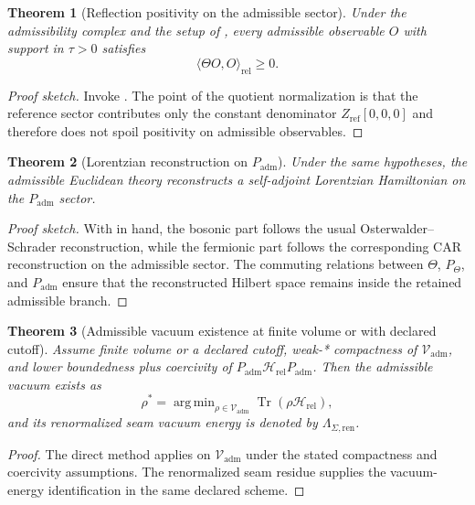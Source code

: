 \documentclass[11pt,a4paper]{article}
\newtheorem{theorem}{Theorem}[section]
\theoremstyle{definition}
\theoremstyle{remark}
\DeclareMathOperator{\tr}{Tr}
\DeclareMathOperator{\argmin}{arg\,min}
\newcommand{\Seam}{\Sigma}
\newcommand{\Vadm}{\mathcal V_{\mathrm{adm}}}
\newcommand{\Hrel}{\mathcal H_{\mathrm{rel}}}
\newcommand{\Padm}{P_{\mathrm{adm}}}
\begin{document}
\begin{theorem}[Reflection positivity on the admissible sector]
\label{thm:reflection-positivity-admissible}
Under the admissibility complex and the setup of , every admissible observable $O$ with support in $\tau>0$ satisfies
\[
\langle \Theta O,O\rangle_{\mathrm{rel}}\ge 0.
\]
\end{theorem}

\begin{proof}[Proof sketch]
Invoke . The point of the quotient normalization is that the reference sector contributes only the constant denominator $Z_{\mathrm{ref}}[0,0,0]$ and therefore does not spoil positivity on admissible observables.
\end{proof}

\begin{theorem}[Lorentzian reconstruction on \texorpdfstring{$\Padm$}{Padm}]
\label{thm:lorentzian-reconstruction}
Under the same hypotheses, the admissible Euclidean theory reconstructs a self-adjoint Lorentzian Hamiltonian on the $\Padm$ sector.
\end{theorem}

\begin{proof}[Proof sketch]
With  in hand, the bosonic part follows the usual Osterwalder--Schrader reconstruction, while the fermionic part follows the corresponding CAR reconstruction on the admissible sector. The commuting relations between $\Theta$, $P_\Theta$, and $\Padm$ ensure that the reconstructed Hilbert space remains inside the retained admissible branch.
\end{proof}

\begin{theorem}[Admissible vacuum existence at finite volume or with declared cutoff]
\label{thm:admissible-vacuum-existence}
Assume finite volume or a declared cutoff, weak-* compactness of $\Vadm$, and
lower boundedness plus coercivity of $\Padm\Hrel\Padm$. Then the admissible
vacuum exists as
\[
\rho^\ast=\argmin_{\rho\in\Vadm}\tr(\rho\Hrel),
\]
and its renormalized seam vacuum energy is denoted by $\Lambda_{\Seam,\mathrm{ren}}$.
\end{theorem}

\begin{proof}
The direct method applies on $\Vadm$ under the stated compactness and coercivity
assumptions. The renormalized seam residue supplies the vacuum-energy
identification in the same declared scheme.
\end{proof}
\end{document}
